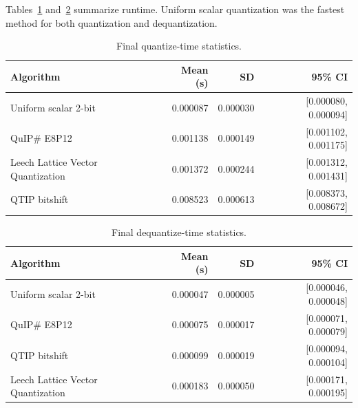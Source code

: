 \documentclass[11pt]{article}
\begin{document}
\begin{table}[H]
\centering
\caption{Final reconstruction quality statistics.}
\label{tab:quality}
\end{table}

Tables~\ref{tab:quantize-time} and~\ref{tab:dequantize-time} summarize runtime. Uniform scalar quantization was the fastest method for both quantization and dequantization.

\begin{table}[H]
\centering
\caption{Final quantize-time statistics.}
\label{tab:quantize-time}
\begin{tabular}{lrrr}
\toprule
Algorithm & Mean (s) & SD & 95\% CI \\
\midrule
Uniform scalar 2-bit & 0.000087 & 0.000030 & [0.000080, 0.000094] \\
QuIP\# E8P12 & 0.001138 & 0.000149 & [0.001102, 0.001175] \\
Leech Lattice Vector Quantization & 0.001372 & 0.000244 & [0.001312, 0.001431] \\
QTIP bitshift & 0.008523 & 0.000613 & [0.008373, 0.008672] \\
\bottomrule
\end{tabular}
\end{table}

\begin{table}[H]
\centering
\caption{Final dequantize-time statistics.}
\label{tab:dequantize-time}
\begin{tabular}{lrrr}
\toprule
Algorithm & Mean (s) & SD & 95\% CI \\
\midrule
Uniform scalar 2-bit & 0.000047 & 0.000005 & [0.000046, 0.000048] \\
QuIP\# E8P12 & 0.000075 & 0.000017 & [0.000071, 0.000079] \\
QTIP bitshift & 0.000099 & 0.000019 & [0.000094, 0.000104] \\
Leech Lattice Vector Quantization & 0.000183 & 0.000050 & [0.000171, 0.000195] \\
\bottomrule
\end{tabular}
\end{table}
\end{document}
